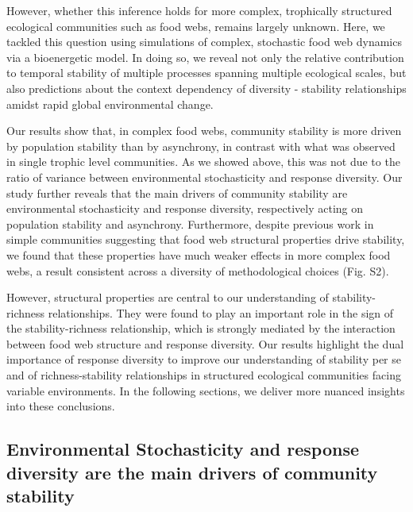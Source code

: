 \documentclass[
]{article}
\begin{document}
However, whether this inference holds for more complex, trophically structured
ecological communities such as food webs, remains largely unknown. Here, we
tackled this question using simulations of complex, stochastic food web
dynamics via a bioenergetic model. In doing so, we reveal not only the relative
contribution to temporal stability of multiple processes spanning multiple
ecological scales, but also predictions about the context dependency of
diversity - stability relationships amidst rapid global environmental change.

Our results show that, in complex food webs, community stability is more driven
by population stability than by asynchrony, in contrast with what was observed
in single trophic level communities. As we showed above, this was not due to
the ratio of variance between environmental stochasticity and response
diversity. Our study further reveals that the main drivers of community
stability are environmental stochasticity and response diversity, respectively
acting on population stability and asynchrony. Furthermore, despite previous
work in simple communities suggesting that food web structural properties drive
stability, we found that these properties have much weaker effects in more
complex food webs, a result consistent across a diversity of methodological
choices (Fig. S2).

However, structural properties are central to our understanding of
stability-richness relationships. They were found to play an important role in
the sign of the stability-richness relationship, which is strongly mediated by
the interaction between food web structure and response diversity. Our results
highlight the dual importance of response diversity to improve our
understanding of stability per se and of richness-stability relationships in
structured ecological communities facing variable environments. In the
following sections, we deliver more nuanced insights into these conclusions.

\hypertarget{environmental-stochasticity-and-response-diversity-are-the-main-drivers-of-community-stability}{%
\subsection{Environmental Stochasticity and response diversity are the main drivers of community stability}\label{environmental-stochasticity-and-response-diversity-are-the-main-drivers-of-community-stability}}
\end{document}
